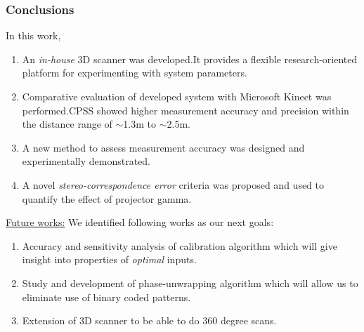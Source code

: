 \documentclass[9pt]{beamer}
\begin{document}
\begin{frame}
\frametitle{Conclusions}
In this work,
\begin{enumerate}
\item An \textit{in-house} 3D scanner was developed.It provides a flexible research-oriented platform for experimenting with system parameters.
\item Comparative evaluation of developed system with Microsoft Kinect was performed.CPSS showed higher measurement accuracy and precision within the distance range of $\sim$1.3m to $\sim$2.5m.
\item A new method to assess measurement accuracy was designed and experimentally demonstrated.
\item A novel \textit{stereo-correspondence error} criteria was proposed and used to quantify the effect of projector gamma. 
\end{enumerate}
\underline{Future works:}\newline
We identified following works as our next goals:
\begin{enumerate}
\item Accuracy and sensitivity analysis of calibration algorithm which will give insight into properties of \textit{optimal} inputs.
\item Study and development of phase-unwrapping algorithm which will allow us to eliminate use of binary coded patterns.
\item Extension of 3D scanner to be able to do 360 degree scans.
\end{enumerate}
\end{frame}
\end{document}
